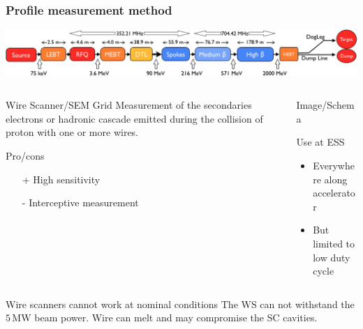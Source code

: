 \begin{frame}
  \frametitle{Profile measurement method}
  \includegraphics[width=\textwidth]{01_Neutron/fig/fig000_ESS_acc}
  \begin{columns}
    \begin{column}{0.45\textwidth}
      \begin{block}{Wire Scanner/SEM Grid}
        Measurement of the secondaries electrons or hadronic cascade emitted during the collision of proton with one or more wires.
      \end{block}
      \begin{block}{Pro/cons}
        \begin{itemize}
          \item[+] High sensitivity
          \item[-] Interceptive measurement
        \end{itemize}
      \end{block}
    \end{column}
    \begin{column}{0.45\textwidth}
      Image/Schema
      \begin{block}{Use at ESS}
        \begin{itemize}
          \item Everywhere along accelerator
          \item But limited to low duty cycle
        \end{itemize}
      \end{block}
    \end{column}
  \end{columns}
  \begin{alertblock}{Wire scanners cannot work at nominal conditions}
    The WS can not withstand the $5\,\mathrm{MW}$ beam power. Wire can melt and may compromise the SC cavities.
  \end{alertblock}
\end{frame}


